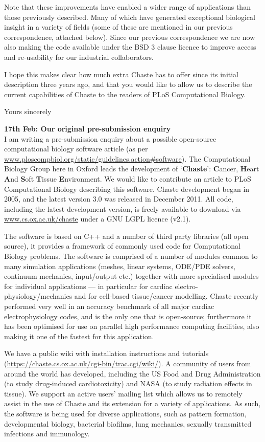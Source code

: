 \documentclass{oxcsletter}
\begin{document}
\begin{letter}{}
Note that these improvements have enabled a wider range of applications than those previously described. 
Many of which have generated exceptional biological insight in a variety of fields (some of these are mentioned in our previous correspondence, attached below).
Since our previous correspondence we are now also making the code available under the BSD 3 clause licence to improve access and re-usability for our industrial collaborators. 

I hope this makes clear how much extra Chaste has to offer since its initial description three years ago, 
and that you would like to allow us to describe the current capabilities of Chaste to the readers of PLoS Computational Biology.

\closing{Yours sincerely}
\newpage
\textbf{17th Feb: Our original pre-submission enquiry}\\
I am writing a pre-submission enquiry about a possible open-source computational biology software article (as per \url{www.ploscompbiol.org/static/guidelines.action#software}).
The Computational Biology Group here in Oxford leads the development of `\textbf{Chaste}': \textbf{C}ancer, \textbf{H}eart \textbf{A}nd \textbf{S}oft \textbf{T}issue \textbf{E}nvironment. 
We would like to contribute an article to PLoS Computational Biology describing this software. 
Chaste development began in 2005, and the latest version 3.0 was released in December 2011.
All code, including the latest development version, is freely available to download via \url{www.cs.ox.ac.uk/chaste} under a GNU LGPL licence (v2.1).

The software is based on C++ and a number of third party libraries (all open source), it provides a framework of commonly used code for Computational Biology problems. 
The software is comprised of a number of modules common to many simulation applications (meshes, linear systems, ODE/PDE solvers, continuum mechanics, input/output etc.) together with more specialised modules for individual applications --- in particular for cardiac electro-physiology/mechanics and for cell-based tissue/cancer modelling. 
Chaste recently performed very well in an accuracy benchmark of all major cardiac electrophysiology codes, and is the only one that is open-source; 
furthermore it has been optimised for use on parallel high performance computing facilities, also making it one of the fastest for this application.

We have a public wiki with installation instructions and tutorials (\url{https://chaste.cs.ox.ac.uk/cgi-bin/trac.cgi/wiki/}). 
A community of users from around the world has developed, including the US Food and Drug Administration (to study drug-induced cardiotoxicity) and NASA (to study radiation effects in tissue). 
We support an active users' mailing list which allows us to remotely assist in the use of Chaste and its extension for a variety of applications. 
As such, the software is being used for diverse applications, such as pattern formation, developmental biology, bacterial biofilms, lung mechanics, sexually transmitted infections and immunology. 


\end{letter}
\end{document}
